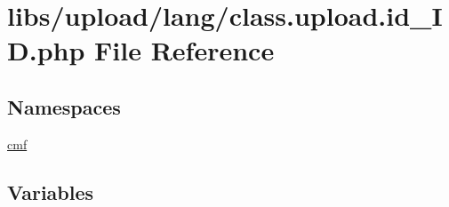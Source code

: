 \hypertarget{class_8upload_8id___i_d_8php}{}\section{libs/upload/lang/class.upload.\+id\+\_\+\+I\+D.\+php File Reference}
\label{class_8upload_8id___i_d_8php}
\subsection*{Namespaces}
\begin{DoxyCompactItemize}
\item 
 \hyperlink{namespacecmf}{cmf}
\end{DoxyCompactItemize}
\subsection*{Variables}
